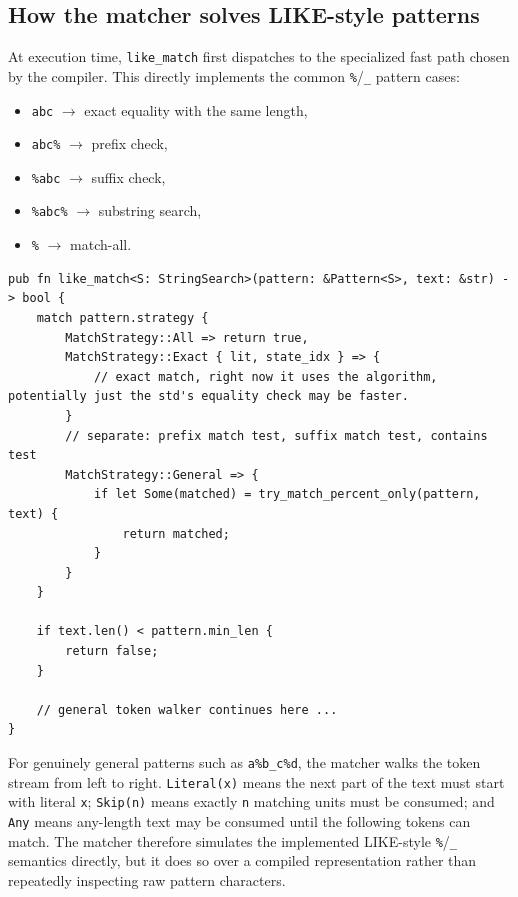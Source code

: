 \documentclass[11pt]{article}
\begin{document}
\subsection{How the matcher solves LIKE-style patterns}

At execution time, \texttt{like\_match} first dispatches to the specialized fast path chosen by the compiler. This directly implements the common \texttt{\%}/\texttt{\_} pattern cases:

\begin{itemize}
    \item \texttt{abc} $\rightarrow$ exact equality with the same length,
    \item \texttt{abc\%} $\rightarrow$ prefix check,
    \item \texttt{\%abc} $\rightarrow$ suffix check,
    \item \texttt{\%abc\%} $\rightarrow$ substring search,
    \item \texttt{\%} $\rightarrow$ match-all.
\end{itemize}

\begin{lstlisting}[style=ruststyle]
pub fn like_match<S: StringSearch>(pattern: &Pattern<S>, text: &str) -> bool {
    match pattern.strategy {
        MatchStrategy::All => return true,
        MatchStrategy::Exact { lit, state_idx } => {
            // exact match, right now it uses the algorithm, potentially just the std's equality check may be faster.
        }
        // separate: prefix match test, suffix match test, contains test
        MatchStrategy::General => {
            if let Some(matched) = try_match_percent_only(pattern, text) {
                return matched;
            }
        }
    }

    if text.len() < pattern.min_len {
        return false;
    }

    // general token walker continues here ...
}
\end{lstlisting}

For genuinely general patterns such as \texttt{a\%b\_c\%d}, the matcher walks the token stream from left to right. \texttt{Literal(x)} means the next part of the text must start with literal \texttt{x}; \texttt{Skip(n)} means exactly \texttt{n} matching units must be consumed; and \texttt{Any} means any-length text may be consumed until the following tokens can match. The matcher therefore simulates the implemented LIKE-style \texttt{\%}/\texttt{\_} semantics directly, but it does so over a compiled representation rather than repeatedly inspecting raw pattern characters.
\end{document}
